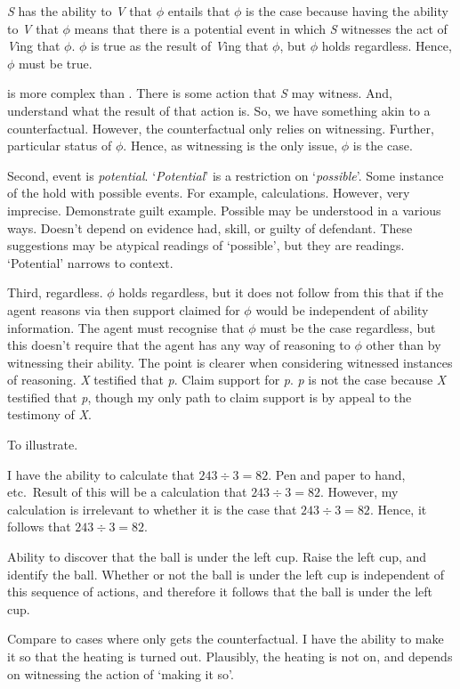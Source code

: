 \begin{note}[\WR{} def.]
  \begin{definition}[\WR{}]
    \emph{S} has the ability to \emph{V} that \(\phi\) entails that \(\phi\) is the case because having the ability to \emph{V} that \(\phi\) means that there is a potential event in which \emph{S} witnesses the act of \emph{V}ing that \(\phi\).
    \(\phi\) is true as the result of \emph{V}ing that \(\phi\), but \(\phi\) holds regardless.
    Hence, \(\phi\) must be true.
  \end{definition}

  \WR{} is more complex than \AR{}.
  There is some action that \emph{S} may witness.
  And, understand what the result of that action is.
  So, we have something akin to a counterfactual.
  However, the counterfactual only relies on witnessing.
  Further, particular status of \(\phi\).
  Hence, as witnessing is the only issue, \(\phi\) is the case.

  Second, event is \emph{potential}.
  `\emph{Potential}' is a restriction on `\emph{possible}'.
  Some instance of the \aben{} hold with possible events.
  For example, calculations.
  However, very imprecise.
  Demonstrate guilt example.
  Possible may be understood in a various ways.
  Doesn't depend on evidence had, skill, or guilty of defendant.
  These suggestions may be atypical readings of `possible', but they are readings.
  `Potential' narrows to context.

  Third, regardless.
  \(\phi\) holds regardless, but it does not follow from this that if the agent reasons via \WR{} then support claimed for \(\phi\) would be independent of ability information.
  The agent must recognise that \(\phi\) must be the case regardless, but this doesn't require that the agent has any way of reasoning to \(\phi\) other than by witnessing their ability.
  The point is clearer when considering witnessed instances of reasoning.
  \emph{X} testified that \emph{p}.
  Claim support for \emph{p}.
  \emph{p} is not the case because \emph{X} testified that \emph{p}, though my only path to claim support is by appeal to the testimony of \emph{X}.

  To illustrate.

  I have the ability to calculate that \(243 \div 3 = 82\).
  Pen and paper to hand, etc.\
  Result of this will be a calculation that \(243 \div 3 = 82\).
  However, my calculation is irrelevant to whether it is the case that \(243 \div 3 = 82\).
  Hence, it follows that \(243 \div 3 = 82\).

  Ability to discover that the ball is under the left cup.
  Raise the left cup, and identify the ball.
  Whether or not the ball is under the left cup is independent of this sequence of actions, and therefore it follows that the ball is under the left cup.

  Compare to cases where only gets the counterfactual.
  I have the ability to make it so that the heating is turned out.
  Plausibly, the heating is not on, and depends on witnessing the action of `making it so'.
\end{note}

